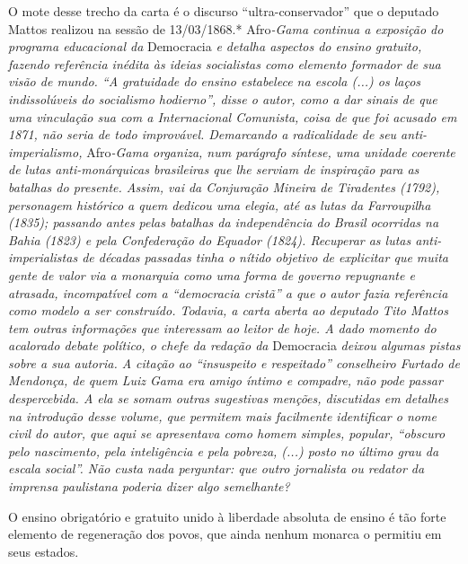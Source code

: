 \begin{didascalia}
O mote desse trecho da carta é o discurso ``ultra-conservador'' que o
deputado Mattos realizou na sessão de 13/03/1868.* Afro\emph{-Gama
continua a exposição do programa educacional da} Democracia \emph{e
detalha aspectos do ensino gratuito, fazendo referência inédita às
ideias socialistas como elemento formador de sua visão de mundo. ``A
gratuidade do ensino estabelece na escola (...) os laços indissolúveis
do socialismo hodierno'', disse o autor, como a dar sinais de que uma
vinculação sua com a Internacional Comunista, coisa de que foi acusado
em 1871, não seria de todo improvável. Demarcando a radicalidade de seu
anti-imperialismo,} Afro\emph{-Gama organiza, num parágrafo síntese, uma
unidade coerente de lutas anti-monárquicas brasileiras que lhe serviam
de inspiração para as batalhas do presente. Assim, vai da Conjuração
Mineira de Tiradentes (1792), personagem histórico a quem dedicou uma
elegia, até as lutas da Farroupilha (1835); passando antes pelas
batalhas da independência do Brasil ocorridas na Bahia (1823) e pela
Confederação do Equador (1824). Recuperar as lutas anti-imperialistas de
décadas passadas tinha o nítido objetivo de explicitar que muita gente
de valor via a monarquia como uma forma de governo repugnante e
atrasada, incompatível com a ``democracia cristã'' a que o autor fazia
referência como modelo a ser construído. Todavia, a carta aberta ao
deputado Tito Mattos tem outras informações que interessam ao leitor de
hoje. A dado momento do acalorado debate político, o chefe da redação
da} Democracia \emph{deixou algumas pistas sobre a sua autoria. A
citação ao ``insuspeito e respeitado'' conselheiro Furtado de Mendonça, de
quem Luiz Gama era amigo íntimo e compadre, não pode passar
despercebida. A ela se somam outras sugestivas menções, discutidas em
detalhes na introdução desse volume, que permitem mais facilmente
identificar o nome civil do autor, que aqui se apresentava como homem
simples, popular, ``obscuro pelo nascimento, pela inteligência e pela
pobreza, (...) posto no último grau da escala social''. Não custa nada
perguntar: que outro jornalista ou redator da imprensa paulistana
poderia dizer algo semelhante?}
\end{didascalia}

\asterisc{}

O ensino obrigatório e gratuito unido à liberdade absoluta de ensino é
tão forte elemento de regeneração dos povos, que ainda nenhum monarca o
permitiu em seus estados.

